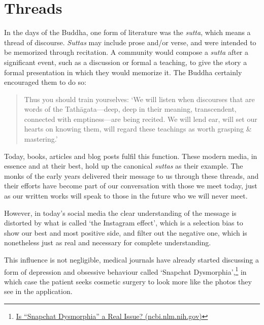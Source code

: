 \clearpage

\section{Threads}


In the days of the Buddha, one form of literature was the \emph{sutta},
which means a thread of discourse. \emph{Suttas} may include prose
and/or verse, and were intended to be memorized through recitation. A
community would compose a \emph{sutta} after a significant event, such
as a discussion or formal a teaching, to give the story a formal
presentation in which they would memorize it. The Buddha certainly
encouraged them to do so:

\begin{quote}
Thus you should train yourselves: `We will listen when discourses that
are words of the Tathāgata---deep, deep in their meaning, transcendent,
connected with emptiness---are being recited. We will lend ear, will set
our hearts on knowing them, will regard these teachings as worth
grasping \& mastering.'

\bigskip

\end{quote}

Today, books, articles and blog posts fulfil this function. These modern
media, in essence and at their best, hold up the canonical \emph{suttas}
as their example. The monks of the early years delivered their message
to us through these threads, and their efforts have become part of our
conversation with those we meet today, just as our written works will
speak to those in the future who we will never meet.


However, in today's social media the clear understanding of the message
is distorted by what is called `the Instagram effect', which is a
selection bias to show our best and most positive side, and filter out
the negative one, which is nonetheless just as real and necessary for
complete understanding.

This influence is not negligible, medical journals have already started
discussing a form of depression and obsessive behaviour called `Snapchat
Dysmorphia',\footnote{\href{https://www.ncbi.nlm.nih.gov/pmc/articles/PMC5933578/}{Is
  ``Snapchat Dysmorphia'' a Real Issue? (ncbi.nlm.nih.gov)}} in which
case the patient seeks cosmetic surgery to look more like the photos
they see in the application.

